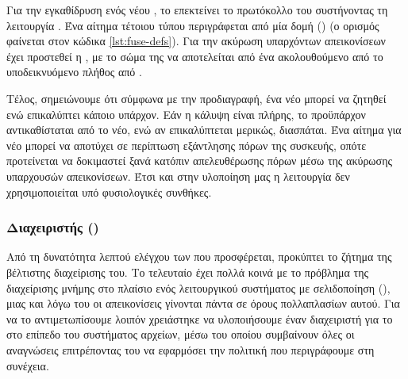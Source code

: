 Για την εγκαθίδρυση ενός νέου , το \viofs{} επεκτείνει το πρωτόκολλο
του  συστήνοντας τη λειτουργία . Ένα αίτημα
τέτοιου τύπου περιγράφεται από μία δομή ()
 (ο ορισμός φαίνεται στον κώδικα
\ref{lst:fuse-defs}). Για την ακύρωση υπαρχόντων απεικονίσεων έχει προστεθεί η
, με το σώμα της να αποτελείται από ένα  ακολουθούμενο από το υποδεικνυόμενο πλήθος από
.

Τέλος, σημειώνουμε ότι σύμφωνα με την προδιαγραφή, ένα νέο  μπορεί
να ζητηθεί ενώ επικαλύπτει κάποιο υπάρχον. Εάν η κάλυψη είναι πλήρης, το
προϋπάρχον αντικαθίσταται από το νέο, ενώ αν επικαλύπτεται μερικώς, διασπάται.
Ένα αίτημα για νέο  μπορεί να αποτύχει σε περίπτωση εξάντλησης
πόρων της συσκευής, οπότε προτείνεται να δοκιμαστεί ξανά κατόπιν απελευθέρωσης
πόρων μέσω της ακύρωσης υπαρχουσών απεικονίσεων. Έτσι και στην υλοποίηση μας η
λειτουργία  δεν χρησιμοποιείται υπό φυσιολογικές
συνθήκες.

\subsubsection{Διαχειριστής ()}

Από τη δυνατότητα λεπτού ελέγχου των  που προσφέρεται,
προκύπτει το ζήτημα της βέλτιστης διαχείρισης του. Το τελευταίο έχει πολλά κοινά
με το πρόβλημα της διαχείρισης μνήμης στο πλαίσιο ενός λειτουργικού συστήματος
με σελιδοποίηση (), μιας και λόγω του  οι
απεικονίσεις γίνονται πάντα σε όρους πολλαπλασίων αυτού. Για να το
αντιμετωπίσουμε λοιπόν χρειάστηκε να υλοποιήσουμε έναν διαχειριστή για το
 στο επίπεδο του συστήματος αρχείων, μέσω του οποίου συμβαίνουν
όλες οι αναγνώσεις επιτρέποντας του να εφαρμόσει την πολιτική που περιγράφουμε
στη συνέχεια.


